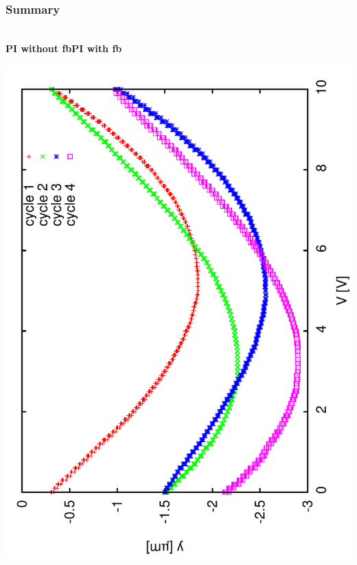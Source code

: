 \documentclass[a4paper,11pt]{book}
\begin{document}
\subsubsection{Summary}
\\
\textbf{PI without fb}\hspace*{2.6cm}\textbf{PI with  fb}\par
\includegraphics[angle=-90,scale=0.10]{image52.pdf}\hspace*{2cm}
\end{document}
